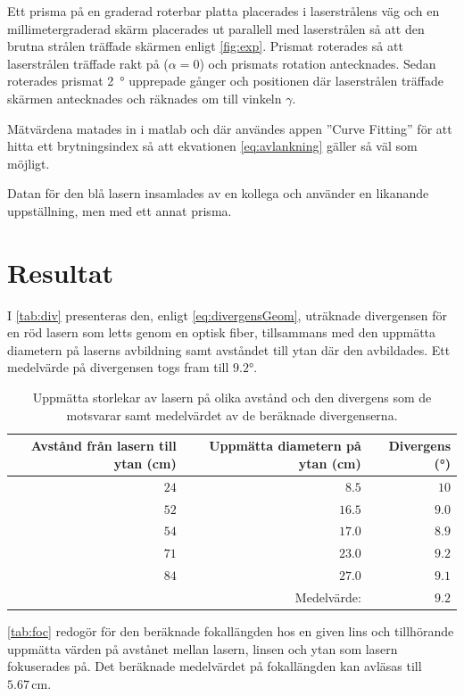 \documentclass[a4paper]{article}
\newcommand{\unit}[1]{\ensuremath{\,\mathrm{#1}}}
\begin{document}
  Ett prisma på en graderad roterbar platta placerades i laserstrålens väg och en millimetergraderad skärm placerades ut parallell med laserstrålen så att den brutna strålen träffade skärmen enligt \autoref{fig:exp}. Prismat roterades så att laserstrålen träffade rakt på ($\alpha=0$) och prismats rotation antecknades. Sedan roterades prismat \SI{2}{\degree} upprepade gånger och positionen där laserstrålen träffade skärmen antecknades och räknades om till vinkeln $\gamma$.
  
  Mätvärdena matades in i matlab och där användes appen ”Curve Fitting” för att hitta ett brytningsindex så att ekvationen \eqref{eq:avlankning} gäller så väl som möjligt.

  Datan för den blå lasern insamlades av en kollega och använder en likanande uppställning, men med ett annat prisma.

\section{Resultat}

I \autoref{tab:div} presenteras den, enligt \autoref{eq:divergensGeom}, uträknade divergensen för en röd lasern som letts genom en optisk fiber, tillsammans med den uppmätta diametern på laserns avbildning samt avståndet till ytan där den avbildades. Ett medelvärde på divergensen togs fram till $9.2\si{\degree}$.

\FloatBarrier
\begin{table}[h]
	\centering
	\caption{Uppmätta storlekar av lasern på olika avstånd och den divergens som de motsvarar samt medelvärdet av de beräknade divergenserna.}
	\label{tab:div}
	\begin{tabular}{|rrr|}%
		\hline
		Avstånd från lasern till ytan (\si{\centi\meter}) & Uppmätta diametern på ytan (\si{\centi\meter}) & Divergens (\si{\degree}) \\
		\hline
		$24$ & $8.5$ & $10$ \\
		$52$ & $16.5$ & $9.0$ \\
		$54$ & $17.0$ & $8.9$ \\
		$71$ & $23.0$ & $9.2$ \\
		$84$ & $27.0$ & $9.1$ \\\hline
		& Medelvärde: & $9.2$ \\\hline
	\end{tabular}
\end{table}
\FloatBarrier

\autoref{tab:foc} redogör för den beräknade fokallängden hos en given lins och tillhörande uppmätta värden på avstånet mellan lasern, linsen och ytan som lasern fokuserades på. Det beräknade medelvärdet på fokallängden kan avläsas till $5.67\unit{cm}$.
\end{document}
